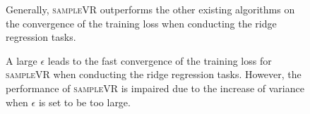 \documentclass[letterpaper]{article}
\begin{document}
\begin{figure}[t]
\caption{Generally, \textsc{sampleVR}  outperforms the other existing algorithms on the convergence of the training loss when conducting the ridge regression tasks.}
\label{figure_ridge_regression_convergence}
\end{figure}



\begin{figure}[t]
\centering
{}
\caption{A large $\epsilon$ leads to the fast convergence of the training loss for \textsc{sampleVR} when conducting the ridge regression tasks. However, the performance of  \textsc{sampleVR} is impaired  due to the increase of variance when $\epsilon$ is set to be too large.}
\label{figure_ridge_regression_rho}
\end{figure}
\end{document}
